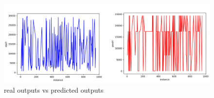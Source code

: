 \documentclass{article}
\begin{document}
\begin{figure}[H]
  \centering
  \hspace*{-0.8in}
  \includegraphics[scale=0.5]{realY-vs-predY.png}
  \caption{real outputs vs predicted outputs}
\end{figure}

\pagebreak

\renewcommand\refname{References}

\end{document}
